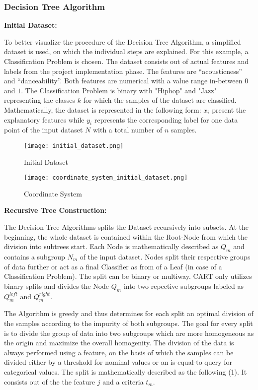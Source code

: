 \subsubsection{Decision Tree Algorithm}

\textbf{Initial Dataset:}

To better visualize the procedure of the Decision Tree Algorithm, a simplified dataset is used, 
on which the individual steps are explained. For this example, a Classification Problem is chosen. 
The dataset consists out of actual features and labels from the project implementation phase. The 
features are “acousticness” and “danceability”. Both features are numerical with a value range 
in-between \(0\) and \(1\). The Classification Problem is binary with "Hiphop" and "Jazz" representing 
the classes \(k\) for which the samples of the dataset are classified. Mathematically, the dataset 
is represented in the following form: \(x_{i}\) present the explanatory features while \(y_{i}\) represents 
the corresponding label for one data point of the input dataset \(N\) with a total number of \(n\) 
samples.

\begin{figure}[H]
    \centering
    \caption[]{Initial Dataset}
	\label{fig:initial_dataset}
    \texttt{[image: initial\_dataset.png]}
\end{figure}

\begin{figure}[H]
    \centering
    \caption[]{Coordinate System}
	\label{fig:coordinate_system_initial_dataset}
    \texttt{[image: coordinate\_system\_initial\_dataset.png]}
\end{figure}

\textbf{Recursive Tree Construction:} 

The Decision Tree Algorithms splits the Dataset recursively into subsets. At the beginning, the whole dataset is 
contained within the Root-Node from which the division into subtrees start. Each Node is mathematically described
as \(Q_{m}\) and contains a subgroup \(N_{m}\) of the input dataset. Nodes split their respective groups of data 
further or act as a final Classifier as from of a Leaf (in case of a Classification Problem). The split can be 
binary or multiway. CART only utilizes binary splits and divides the Node \(Q_{m}\) into two repective subgroups 
labeled as \(Q^{left}_{m}\) and \(Q^{right}_{m}\). 

The Algorithm is greedy and thus determines for each split an optimal division of the samples according to 
the impurity of both subgroups. The goal for every split is to divide the group of data into two subgroups which are 
more homogeneous as the origin and maximize the overall homogenity. The division of the data is 
always performed using a feature, on the basis of which the samples can be divided either by a threshold for 
nominal values or an is-equal-to query for categorical values. The split is mathematically described as the 
following (1). It consists out of the the feature \(j\) and a criteria \(t_{m}\).

